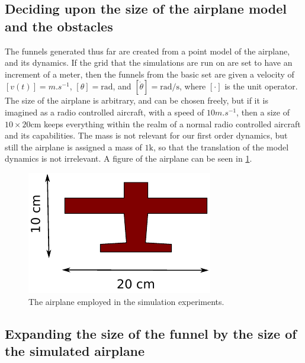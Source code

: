 \subsection{Deciding upon the size of the airplane model and the obstacles}
\label{subsec:deciding-model-size}

The funnels generated thus far are created from a point model of the airplane,
and its dynamics. If the grid that the simulations are run on are set to have an
increment of a meter, then the funnels from the basic set are given a velocity
of \([v(t)] = \si{m.s^{-1}}\), \([\theta] = \si{\radian}\), and \([\dot{\theta}]
= \si{\radian\per\second}\), where \([\cdot]\) is the unit operator. The size of
the airplane is arbitrary, and can be chosen freely, but if it is imagined as a
radio controlled aircraft, with a speed of \(10\si{m.s^{-1}}\), then a size of
\(10 \times 20 \si{\centi\metre} \) keeps everything within the realm of a
normal radio controlled aircraft and its capabilities. The mass is not relevant
for our first order dynamics, but still the airplane is assigned a mass of \(1
\si{\kilo}\), so that the translation of the model dynamics is not irrelevant. A
figure of the airplane can be seen in \cref{fig:radio-vehicle}.

\begin{figure}
  \centering
  \includegraphics[width=\textwidth]{figures/experiments/radio-vehicle-model}
  \caption{The airplane employed in the simulation experiments.}
  \label{fig:radio-vehicle}
\end{figure}

\subsection{Expanding the size of the funnel by the size of the simulated
  airplane}
\label{subsec:expand-funnel}

